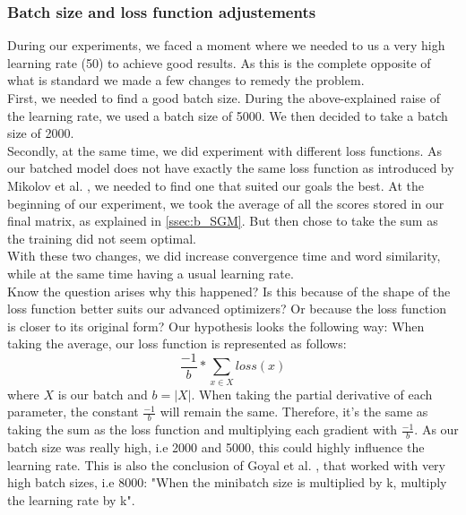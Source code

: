 \subsubsection{Batch size and loss function adjustements}\label{ssec:bs_lf}
During our experiments, we faced a moment where we needed to us a very high learning rate (50) to achieve good results. As this is the complete opposite of what is standard we made a few changes to remedy the problem.\\
First, we needed to find a good batch size. During the above-explained raise of the learning rate, we used a batch size of 5000. We then decided to take a batch size of 2000.\\
Secondly, at the same time, we did experiment with different loss functions. As our batched model does not have exactly the same loss function as introduced by Mikolov et al. \cite{mikolov}, we needed to find one that suited our goals the best. At the beginning of our experiment, we took the average of all the scores stored in our final matrix, as explained in \ref{ssec:b_SGM}. But then chose to take the sum as the training did not seem optimal.\\
With these two changes, we did increase convergence time and word similarity, while at the same time having a usual learning rate. \\
Know the question arises why this happened? Is this because of the shape of the loss function better suits our advanced optimizers? Or because the loss function is closer to its original form? Our hypothesis looks the following way:
When taking the average, our loss function is represented as follows:
\begin{equation}
\frac{-1}{b }* \sum_{x\in X} loss(x)
\end{equation}
where $X$ is our batch and $b = |X|$.
When taking the partial derivative of each parameter, the constant $ \frac{-1}{b }$ will remain the same. Therefore, it's the same as taking the sum as the loss function and multiplying each gradient with $\frac{-1}{b }$. As our batch size was really high, i.e 2000 and 5000, this could highly influence the learning rate. This is also the conclusion of Goyal et al. \cite{fb}, that worked with very high batch sizes, i.e 8000: "When the minibatch size is multiplied by k, multiply the learning rate by k".

